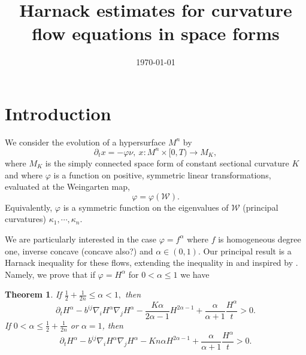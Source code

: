 \documentclass{amsart}
\newtheorem{theorem}{Theorem}
\theoremstyle{definition}
\theoremstyle{remark}
\numberwithin{equation}{section}
\begin{document}
\title[]
 {Harnack estimates for curvature flow equations in space forms}

\curraddr{}
\email{}
\date{\today}

\dedicatory{}
\subjclass[2010]{}
\keywords{}

\begin{abstract}
\end{abstract}

\maketitle

\section{Introduction}

We consider the evolution of a hypersurface $M^n$ by
\[
\partial_tx=-\varphi\nu,~ x:M^n\times[0,T)\to M_K,
\]
where \(M_K\) is the simply connected space form of constant sectional curvature \(K\) and where $\varphi$ is a function on positive, symmetric linear transformations, evaluated at the Weingarten map,
\[
\varphi = \varphi(\mathcal{W}).
\]
Equivalently, \(\varphi\) is a symmetric function on the eigenvalues of \(\mathcal{W}\) (principal curvatures) \(\kappa_1, \cdots, \kappa_n\).

We are particularly interested in the case \(\varphi = f^{\alpha}\) where \(f\) is homogeneous degree one, inverse concave (concave also?) and \(\alpha \in (0,1)\). Our principal result is a Harnack inequality for these flows, extending the inequality in \cite{2015arXiv150802821B, bryanlouie} and inspired by \cite{MR1316556, MR1100812, MR1296393, MR1480081}. Namely, we prove that if \(\varphi = H^{\alpha}\) for \(0 < \alpha \leq 1\) we have

\begin{theorem}
If $\frac{1}{2}+\frac{1}{2n}\leq {\alpha}< 1,$ then
\[
\partial_t H^{\alpha} - b^{ij}\nabla_iH^{\alpha}\nabla_jH^{\alpha} - \frac{K {\alpha}}{2{\alpha}-1}H^{2{\alpha}-1} + \frac{{\alpha}}{{\alpha}+1} \frac{H^{\alpha}}{t} > 0.
\]
If $0<{\alpha}\leq \frac{1}{2} + \frac{1}{2n}$ or ${\alpha}=1$, then
\[
\partial_t H^{\alpha} - b^{ij}\nabla_iH^{\alpha}\nabla_jH^{\alpha} - K n{\alpha}H^{2{\alpha}-1} + \frac{{\alpha}}{{\alpha}+1} \frac{H^{\alpha}}{t} > 0.
\]
\end{theorem}
\end{document}
